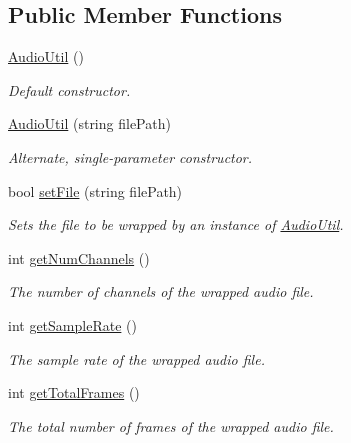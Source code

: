 \subsection*{Public Member Functions}
\begin{DoxyCompactItemize}
\item 
\hyperlink{classAudioUtil_a6d030f910af2f43c606be1bee03ed18e}{AudioUtil} ()
\begin{DoxyCompactList}\small\item\em Default constructor. \item\end{DoxyCompactList}\item 
\hyperlink{classAudioUtil_a8c8a360f57a0fe1ab48b8571e4ff609b}{AudioUtil} (string filePath)
\begin{DoxyCompactList}\small\item\em Alternate, single-\/parameter constructor. \item\end{DoxyCompactList}\item 
bool \hyperlink{classAudioUtil_a5f477f4385a0da16f930d627dc168723}{setFile} (string filePath)
\begin{DoxyCompactList}\small\item\em Sets the file to be wrapped by an instance of \hyperlink{classAudioUtil}{AudioUtil}. \item\end{DoxyCompactList}\item 
int \hyperlink{classAudioUtil_ab426f4ff941e0e7eeb68c2c1eb0cb333}{getNumChannels} ()
\begin{DoxyCompactList}\small\item\em The number of channels of the wrapped audio file. \item\end{DoxyCompactList}\item 
int \hyperlink{classAudioUtil_afd587ae3381e94d76e826e76d2a38378}{getSampleRate} ()
\begin{DoxyCompactList}\small\item\em The sample rate of the wrapped audio file. \item\end{DoxyCompactList}\item 
int \hyperlink{classAudioUtil_ad4d581baa08a44c7c5d2ee05f589dcf1}{getTotalFrames} ()
\begin{DoxyCompactList}\small\item\em The total number of frames of the wrapped audio file. \item\end{DoxyCompactList}\item 

\end{DoxyCompactItemize}

